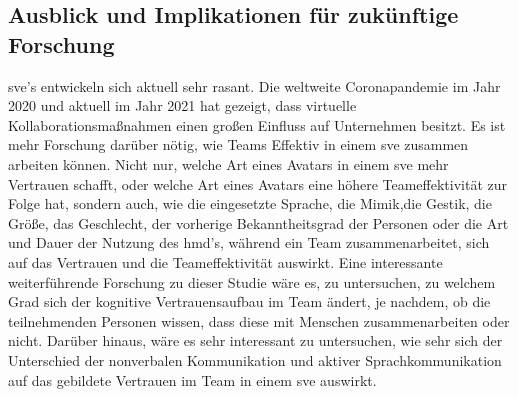 \documentclass[a4paper,11pt]{article}%
\renewcommand{\\}{\vspace*{0.5\baselineskip} \newline}
\begin{document}
\subsection{Ausblick und Implikationen für zukünftige Forschung}
\ac{sve}'s entwickeln sich aktuell sehr rasant. Die weltweite Coronapandemie im Jahr 2020 und aktuell im Jahr 2021 hat gezeigt, dass virtuelle Kollaborationsmaßnahmen einen großen Einfluss auf Unternehmen besitzt. Es ist mehr Forschung darüber nötig, wie Teams Effektiv in einem \ac{sve} zusammen arbeiten können. Nicht nur, welche Art eines Avatars in einem \ac{sve} mehr Vertrauen schafft, oder welche Art eines Avatars eine höhere Teameffektivität zur Folge hat, sondern auch, wie die eingesetzte Sprache, die Mimik,die Gestik, die Größe, das Geschlecht, der vorherige Bekanntheitsgrad der Personen oder die Art und Dauer der Nutzung des \ac{hmd}'s, während ein Team zusammenarbeitet, sich auf das Vertrauen und die Teameffektivität auswirkt.
Eine interessante weiterführende Forschung zu dieser Studie wäre es, zu untersuchen, zu welchem Grad sich der kognitive Vertrauensaufbau im Team ändert, je nachdem, ob die teilnehmenden Personen wissen, dass diese mit Menschen zusammenarbeiten oder nicht.
Darüber hinaus, wäre es sehr interessant zu untersuchen, wie sehr sich der Unterschied der nonverbalen Kommunikation und aktiver Sprachkommunikation auf das gebildete Vertrauen im Team in einem \ac{sve} auswirkt. 

%
%
%
\clearpage
\newpage
\end{document}
